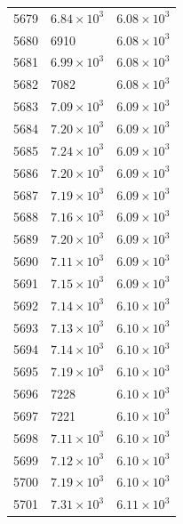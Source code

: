 \begin{table}[H]
\begin{tabular}{lll}
5679 & $\displaystyle 6.84 \times 10^{3}$ & $\displaystyle 6.08 \times 10^{3}$ \\
5680 & 6910 & $\displaystyle 6.08 \times 10^{3}$ \\
5681 & $\displaystyle 6.99 \times 10^{3}$ & $\displaystyle 6.08 \times 10^{3}$ \\
5682 & 7082 & $\displaystyle 6.08 \times 10^{3}$ \\
5683 & $\displaystyle 7.09 \times 10^{3}$ & $\displaystyle 6.09 \times 10^{3}$ \\
5684 & $\displaystyle 7.20 \times 10^{3}$ & $\displaystyle 6.09 \times 10^{3}$ \\
5685 & $\displaystyle 7.24 \times 10^{3}$ & $\displaystyle 6.09 \times 10^{3}$ \\
5686 & $\displaystyle 7.20 \times 10^{3}$ & $\displaystyle 6.09 \times 10^{3}$ \\
5687 & $\displaystyle 7.19 \times 10^{3}$ & $\displaystyle 6.09 \times 10^{3}$ \\
5688 & $\displaystyle 7.16 \times 10^{3}$ & $\displaystyle 6.09 \times 10^{3}$ \\
5689 & $\displaystyle 7.20 \times 10^{3}$ & $\displaystyle 6.09 \times 10^{3}$ \\
5690 & $\displaystyle 7.11 \times 10^{3}$ & $\displaystyle 6.09 \times 10^{3}$ \\
5691 & $\displaystyle 7.15 \times 10^{3}$ & $\displaystyle 6.09 \times 10^{3}$ \\
5692 & $\displaystyle 7.14 \times 10^{3}$ & $\displaystyle 6.10 \times 10^{3}$ \\
5693 & $\displaystyle 7.13 \times 10^{3}$ & $\displaystyle 6.10 \times 10^{3}$ \\
5694 & $\displaystyle 7.14 \times 10^{3}$ & $\displaystyle 6.10 \times 10^{3}$ \\
5695 & $\displaystyle 7.19 \times 10^{3}$ & $\displaystyle 6.10 \times 10^{3}$ \\
5696 & 7228 & $\displaystyle 6.10 \times 10^{3}$ \\
5697 & 7221 & $\displaystyle 6.10 \times 10^{3}$ \\
5698 & $\displaystyle 7.11 \times 10^{3}$ & $\displaystyle 6.10 \times 10^{3}$ \\
5699 & $\displaystyle 7.12 \times 10^{3}$ & $\displaystyle 6.10 \times 10^{3}$ \\
5700 & $\displaystyle 7.19 \times 10^{3}$ & $\displaystyle 6.10 \times 10^{3}$ \\
5701 & $\displaystyle 7.31 \times 10^{3}$ & $\displaystyle 6.11 \times 10^{3}$ \\

\end{tabular}
\end{table}
